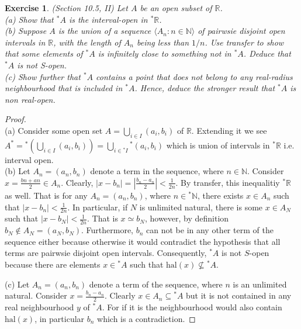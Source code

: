 \documentclass[a4paper, 11pt, openany]{book}
\theoremstyle{plain}
\newtheorem{exercise}{Exercise}[chapter]
\theoremstyle{plain}
\newcommand{\N}{\mathbb{N}}
\newcommand{\R}{\mathbb{R}}
\newcommand{\la}{\langle}
\newcommand{\ra}{\rangle}
\newcommand{\hyp}{{}^*}
\newcommand{\hal}{\text{hal}}
\begin{document}
    \begin{exercise}
      (Section 10.5, II)
      Let $A$ be an open subset of $\R$. \\
      (a) Show that $\hyp A$ is the interval-open in $\hyp \R$. \\
      (b) Suppose $A$ is the union of a sequence $\la A_n: n \in \N \ra$ of pairwsie disjoint open intervals in $\R$, with the length of $A_n$ being less than $1/n$. Use transfer to show that some elements of $\hyp A$ is infinitely close to something not in $\hyp A$. Deduce that $\hyp A$ is not S-open. \\
      (c) Show further that $\hyp A$ contains a point that does not belong to any real-radius neighbourhood that is included in $\hyp A$. Hence, deduce the stronger result that $\hyp A$ is non real-open.
    \end{exercise}
    \begin{proof} $ $ \\

      (a) Consider some open set $A=\bigcup_{i \in I} (a_i,b_i)$ of $\R$. Extending it we see $A^*=\hyp \left( \bigcup_{i \in I} (a_i, b_i) \right)=\bigcup_{i \in  \hyp I} \hyp (a_i, b_i)$ which is union of intervals in $\hyp \R$ i.e. interval open. \\

      (b) Let $A_n=(a_n, b_n)$ denote a term in the sequence, where $n \in \mathbb{N}$. Consider $x=\frac{bn+an}{2} \in A_n$. Clearly, $|x-b_n|=\left|\frac{b_n-a_n}{2} \right|<\frac{1}{2n}$. By transfer, this inequalitiy $\hyp \R$ as well. That is for any $A_n=(a_n, b_n)$, where $n \in \hyp \N$, there exists $x \in A_n$ such that $|x-b_n|<\frac{1}{2n}$. In particular, if $N$ is unlimited natural, there is some $x \in A_N$ such that $|x-b_N|<\frac{1}{2n}$. That is $x \simeq b_N$, however, by definition $b_N \notin A_N=(a_N, b_N)$. Furthermore, $b_n$ can not be in any other term of the sequence either because otherwise it would contradict the hypothesis that all terms are pairwsie disjoint open intervals. Consequently, $\hyp A$ is not $S$-open because there are elements $x \in \hyp A$ such that $\hal(x) \not \subseteq \hyp A$.

      (c) Let $A_n=(a_n, b_n)$ denote a term of the sequence, where $n$ is an unlimited natural. Consider $x=\frac{b_n-a_n}{2}$. Clearly $x \in A_n \subseteq \hyp A$ but it is not contained in any real neighbourhood $y$ of $\hyp A$. For if it is the neighbourhood would also contain $\hal(x)$, in particular $b_n$ which is a contradiction.
    \end{proof}

  
\end{document}
